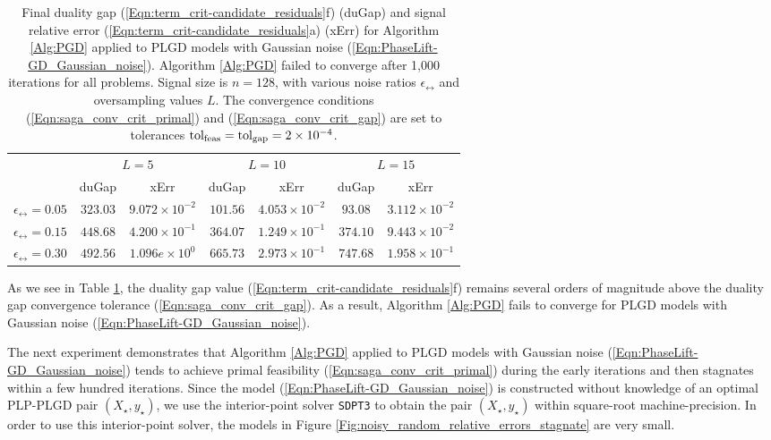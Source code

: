 \begin{enumerate}
\begin{table}[H]
\centering
\begin{tabular}{ |c|cc|cc|cc| }
 \hline

 	&	\multicolumn{2}{c|}{$L = 5$}
 		&	\multicolumn{2}{c|}{$L = 10$}
 			&	\multicolumn{2}{c|}{$L = 15$}	\\
 	&	duGap	&	xErr
 		&	duGap	&	xErr
 			&	duGap	&	xErr		\\ 			
 \hline
$\epsilon_\rel = 0.05$
	&	$323.03$ & $9.072 \times 10^{-2}$
		&	$101.56$ & $4.053 \times 10^{-2}$
			&	$93.08$ & $ 3.112 \times 10^{-2}$ \\
$\epsilon_\rel = 0.15$
	&	$448.68$ & $4.200 \times 10^{-1}$
		&	$364.07$ & $1.249 \times 10^{-1}$
			&	$374.10$ & $9.443 \times 10^{-2} $ \\
$\epsilon_\rel = 0.30$
	&	$492.56$ & $1.096e \times 10^{0}$
		&	$665.73$ & $2.973 \times 10^{-1}$
			&	$747.68$ & $1.958 \times 10^{-1}$ \\
 \hline
\end{tabular}
\caption{Final duality gap  (\ref{Eqn:term_crit-candidate_residuals}f) (duGap) and signal relative error (\ref{Eqn:term_crit-candidate_residuals}a) (xErr) for Algorithm \ref{Alg:PGD} applied to PLGD models with Gaussian noise (\ref{Eqn:PhaseLift-GD_Gaussian_noise}).  Algorithm \ref{Alg:PGD} failed to converge after 1,000 iterations for all problems.  Signal size is $n=128$, with various noise ratios $\epsilon_\rel$ and oversampling values $L$.  The convergence conditions (\ref{Eqn:saga_conv_crit_primal}) and (\ref{Eqn:saga_conv_crit_gap}) are set to tolerances $\textnormal{tol}_\textnormal{feas} = \textnormal{tol}_\textnormal{gap} = 2 \times 10^{-4}$.} \label{Tab:Gaussian_dual_variable_stagnates}
\end{table}

As we see in Table \ref{Tab:Gaussian_dual_variable_stagnates}, the duality gap value (\ref{Eqn:term_crit-candidate_residuals}f) remains several orders of magnitude above the duality gap convergence tolerance (\ref{Eqn:saga_conv_crit_gap}).  As a result, Algorithm \ref{Alg:PGD} fails to converge for PLGD models with Gaussian noise (\ref{Eqn:PhaseLift-GD_Gaussian_noise}).  



The next experiment demonstrates that Algorithm \ref{Alg:PGD} applied to PLGD models with Gaussian noise (\ref{Eqn:PhaseLift-GD_Gaussian_noise}) tends to achieve primal feasibility (\ref{Eqn:saga_conv_crit_primal}) during the early iterations and then stagnates within a few hundred iterations.  Since the model (\ref{Eqn:PhaseLift-GD_Gaussian_noise}) is constructed without knowledge of an optimal PLP-PLGD pair $(X_\star, y_\star)$, we use the interior-point solver \texttt{SDPT3} \cite{toh1999sdpt3} to obtain the pair $(X_\star, y_\star)$ within square-root machine-precision.  In order to use this interior-point solver, the models in Figure \ref{Fig:noisy_random_relative_errors_stagnate} are very small.


\end{enumerate}
